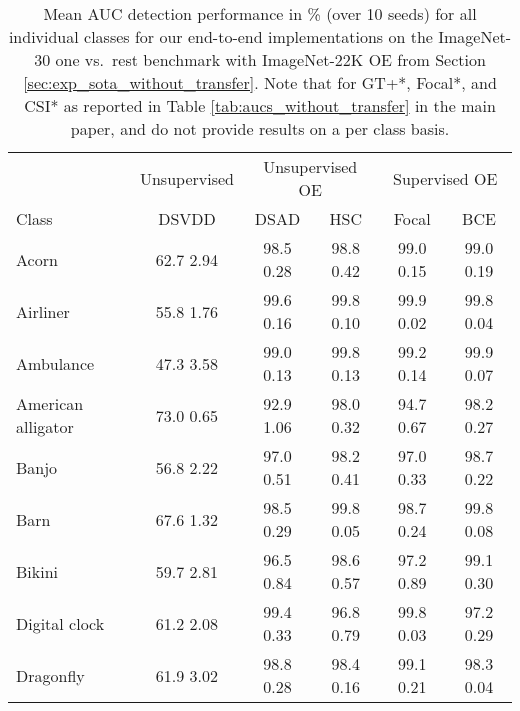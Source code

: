 \documentclass[10pt]{article} \usepackage[accepted]{stylefiles/tmlr}
\begin{document}
\begin{table*}[th]
    \caption{Mean AUC detection performance in \% (over 10 seeds) for all individual classes for our end-to-end implementations on the ImageNet-30 one vs.~rest benchmark with ImageNet-22K OE from Section \ref{sec:exp_sota_without_transfer}. Note that for GT+*, Focal*, and CSI* as reported in Table \ref{tab:aucs_without_transfer} in the main paper, \citet{hendrycks2019using} and \citet{tack2020} do not provide results on a per class basis. }
    \label{tab:imagenet_one_vs_rest_wo_transfer}
    \vspace{0.5em}
    \centering\small
    
\begin{tabular}{lccccc}
\toprule
& \multicolumn{1}{c|}{Unsupervised} & \multicolumn{2}{c|}{Unsupervised OE} & \multicolumn{2}{c}{Supervised OE} \\
Class &   \multicolumn{1}{c|}{DSVDD} & DSAD & \multicolumn{1}{c|}{HSC} & Focal & \multicolumn{1}{c}{BCE} \\
\midrule
Acorn & \multicolumn{1}{c|}{62.7  2.94} & 98.5  0.28 & \multicolumn{1}{c|}{98.8  0.42} & 99.0  0.15 & \multicolumn{1}{c}{99.0  0.19} \\
Airliner & \multicolumn{1}{c|}{55.8  1.76} & 99.6  0.16 & \multicolumn{1}{c|}{99.8  0.10} & 99.9  0.02 & \multicolumn{1}{c}{99.8  0.04} \\
Ambulance & \multicolumn{1}{c|}{47.3  3.58} & 99.0  0.13 & \multicolumn{1}{c|}{99.8  0.13} & 99.2  0.14 & \multicolumn{1}{c}{99.9  0.07} \\
American alligator & \multicolumn{1}{c|}{73.0  0.65} & 92.9  1.06 & \multicolumn{1}{c|}{98.0  0.32} & 94.7  0.67 & \multicolumn{1}{c}{98.2  0.27} \\
Banjo & \multicolumn{1}{c|}{56.8  2.22} & 97.0  0.51 & \multicolumn{1}{c|}{98.2  0.41} & 97.0  0.33 & \multicolumn{1}{c}{98.7  0.22} \\
Barn & \multicolumn{1}{c|}{67.6  1.32} & 98.5  0.29 & \multicolumn{1}{c|}{99.8  0.05} & 98.7  0.24 & \multicolumn{1}{c}{99.8  0.08} \\
Bikini & \multicolumn{1}{c|}{59.7  2.81} & 96.5  0.84 & \multicolumn{1}{c|}{98.6  0.57} & 97.2  0.89 & \multicolumn{1}{c}{99.1  0.30} \\
Digital clock & \multicolumn{1}{c|}{61.2  2.08} & 99.4  0.33 & \multicolumn{1}{c|}{96.8  0.79} & 99.8  0.03 & \multicolumn{1}{c}{97.2  0.29} \\
Dragonfly & \multicolumn{1}{c|}{61.9  3.02} & 98.8  0.28 & \multicolumn{1}{c|}{98.4  0.16} & 99.1  0.21 & \multicolumn{1}{c}{98.3  0.04} \\

\end{tabular}
\end{table*}
\end{document}
